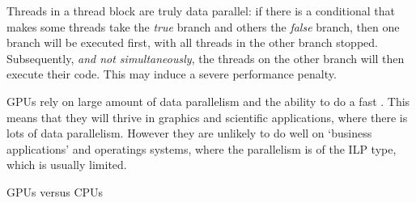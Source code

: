 Threads in a thread block are truly data parallel: if there is a
conditional that makes some threads take the \emph{true} branch and
others the \emph{false} branch, then one branch will be executed
first, with all threads in the other branch stopped. Subsequently,
\emph{and not simultaneously}, the threads on the other branch will
then execute their code. This may induce a severe performance penalty.

\acp{GPU} rely on large amount of data parallelism and the ability to
do a fast
. This means that they will thrive in
graphics and scientific applications, where there is lots of data
parallelism. However they are unlikely to do well on `business
applications' and operatings systems, where the parallelism is of the
\acf{ILP} type, which is usually limited.

 {GPUs versus CPUs}

